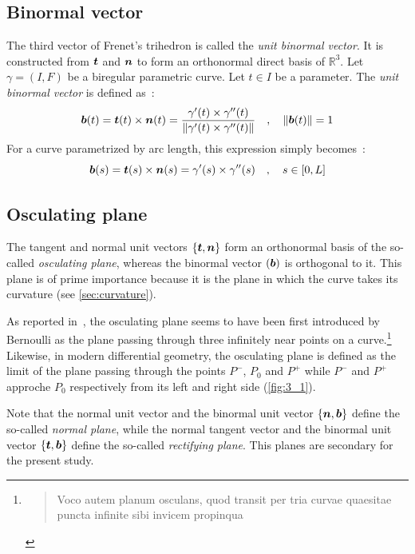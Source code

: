 \subsection{Binormal vector}
The third vector of Frenet's trihedron is called the \emph{unit binormal vector}. It is constructed from $\boldsymbol{t}$ and $\boldsymbol{n}$ to form an orthonormal direct basis of $\mathbb{R}^{3}$. 
Let $\gamma = (I,F)$ be a biregular parametric curve. Let $t \in I$ be a parameter. The \emph{unit binormal vector} is defined as~:
\begin{equation}
	\boldsymbol{b}(t) = \boldsymbol{t}(t) \times \boldsymbol{n}(t)
	= \frac{\gamma'(t) \times \gamma''(t)}{\lVert\gamma'(t) \times \gamma''(t)\rVert}
	\quad,\quad
	\lVert\boldsymbol{b}(t)\rVert=1
\end{equation}
For a curve parametrized by arc length, this expression simply becomes~:
\begin{equation}
	\boldsymbol{b}(s) = \boldsymbol{t}(s) \times \boldsymbol{n}(s)
	= \gamma'(s) \times \gamma''(s)
	\quad,\quad
	s \in [0,L]
\end{equation}

\subsection{Osculating plane}\label{sec:osculatingplane}
The tangent and normal unit vectors $\{\boldsymbol{t},\boldsymbol{n}\}$ form an orthonormal basis of the so-called \emph{osculating plane}, whereas the binormal vector $(\boldsymbol{b})$ is orthogonal to it. This plane is of prime importance because it is the plane in which the curve takes its curvature (see \cref{sec:curvature}).

As reported in~\cite[p.45]{Delcourt2007}, the osculating plane seems to have been first introduced by Bernoulli as the plane passing through three infinitely near points on a curve.\footnote{\blockcquote[p.113]{Bernoulli1728}{Voco autem planum osculans, quod transit per tria curvae quaesitae puncta infinite sibi invicem propinqua}.
} Likewise, in modern differential geometry, the osculating plane is defined as the limit of the plane passing through the points $P^-$, $P_0$ and $P^+$ while $P^-$ and $P^+$ approche $P_0$ respectively from its left and right side (\cref{fig:3_1}).

Note that the normal unit vector and the binormal unit vector $\{\boldsymbol{n},\boldsymbol{b}\}$ define the so-called \emph{normal plane}, while the normal tangent vector and the binormal unit vector $\{\boldsymbol{t},\boldsymbol{b}\}$ define the so-called \emph{rectifying plane}. This planes are secondary for the present study.

